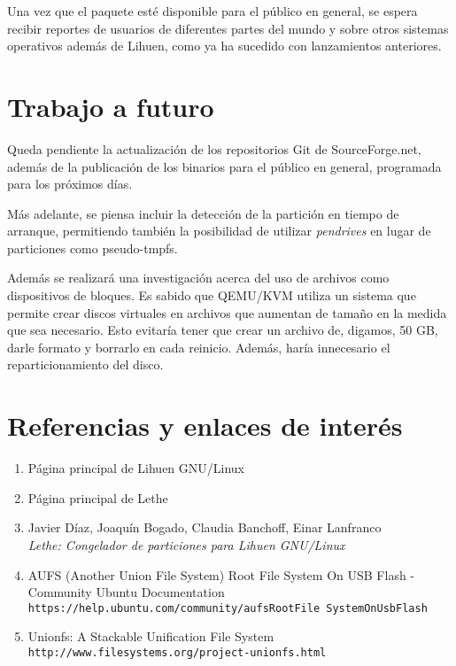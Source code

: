 \documentclass[a4paper,10pt]{article}
\begin{document}
Una vez que el paquete esté disponible para el público en general, se espera recibir reportes de usuarios de diferentes
partes del mundo y sobre otros sistemas operativos además de Lihuen, como ya ha sucedido con lanzamientos anteriores.

\section{Trabajo a futuro}
Queda pendiente la actualización de los repositorios Git de SourceForge.net, además de la publicación de los binarios para
el público en general, programada para los próximos días.

Más adelante, se piensa incluir la detección de la partición en tiempo de arranque, permitiendo también la posibilidad de
utilizar \textit{pendrives} en lugar de particiones como pseudo-tmpfs.

Además se realizará una investigación acerca del uso de archivos como dispositivos de bloques. Es sabido que QEMU/KVM utiliza
un sistema que permite crear discos virtuales en archivos que aumentan de tamaño en la medida que sea necesario. Esto
evitaría tener que crear un archivo de, digamos, 50 GB, darle formato y borrarlo en cada reinicio. Además, haría innecesario
el reparticionamiento del disco.

\section{Referencias y enlaces de interés}

\begin{enumerate}
\item Página principal de Lihuen GNU/Linux\\
\item Página principal de Lethe\\
\item Javier Díaz, Joaquín Bogado, Claudia Banchoff, Einar Lanfranco
\\\textit{Lethe: Congelador de particiones para Lihuen GNU/Linux}\\
\item AUFS (Another Union File System) Root File System On USB Flash - Community Ubuntu Documentation\\
\texttt{https://help.ubuntu.com/community/aufsRootFile SystemOnUsbFlash}
\item Unionfs: A Stackable Unification File System\\
\texttt{http://www.filesystems.org/project-unionfs.html}
\end{enumerate}
\end{document}
